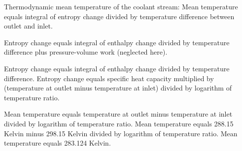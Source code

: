 Thermodynamic mean temperature of the coolant stream:  
Mean temperature equals integral of entropy change divided by temperature difference between outlet and inlet.  

Entropy change equals integral of enthalpy change divided by temperature difference plus pressure-volume work (neglected here).  

Entropy change equals integral of enthalpy change divided by temperature difference.  
Entropy change equals specific heat capacity multiplied by (temperature at outlet minus temperature at inlet) divided by logarithm of temperature ratio.  

Mean temperature equals temperature at outlet minus temperature at inlet divided by logarithm of temperature ratio.  
Mean temperature equals 288.15 Kelvin minus 298.15 Kelvin divided by logarithm of temperature ratio.  
Mean temperature equals 283.124 Kelvin.